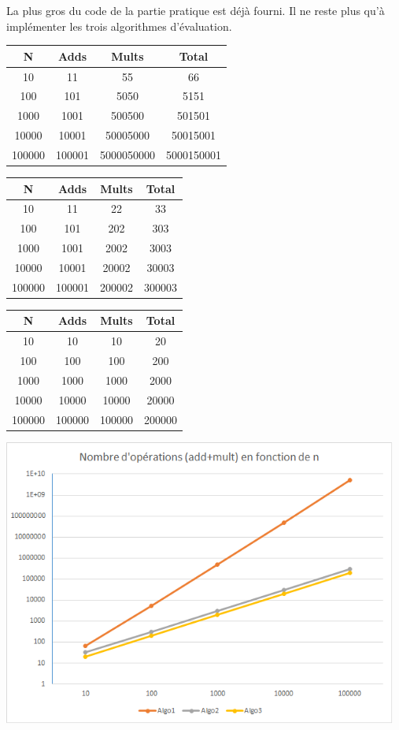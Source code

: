 \documentclass[11pt,a4paper]{article}
\begin{document}
La plus gros du code de la partie pratique est déjà fourni. Il ne reste plus qu'à implémenter les trois algorithmes d'évaluation.

\begin{center}
\begin{tabular}{ | c | c | c | c | }
	\hline  
	N & Adds & Mults & Total \\
	\hline                       
	10 & 11 & 55 & 66 \\
	100 & 101 & 5050 & 5151 \\
	1000 & 1001 & 500500 & 501501 \\
	10000 & 10001 & 50005000 & 50015001 \\
	100000 & 100001 & 5000050000 & 5000150001 \\
	\hline  
\end{tabular}
\end{center}
\begin{center}
\begin{tabular}{ | c | c | c | c | }
	\hline  
	N & Adds & Mults & Total \\
	\hline                       
	10 & 11 & 22 & 33 \\
	100 & 101 & 202 & 303 \\
	1000 & 1001 & 2002 & 3003 \\
	10000 & 10001 & 20002 & 30003 \\
	100000 & 100001 & 200002 & 300003 \\
	\hline  
\end{tabular}
\end{center}
\begin{center}
\begin{tabular}{ | c | c | c | c | }
	\hline  
	N & Adds & Mults & Total \\
	\hline                       
	10 & 10 & 10 & 20 \\
	100 & 100 & 100 & 200 \\
	1000 & 1000 & 1000 & 2000 \\
	10000 & 10000 & 10000 & 20000 \\
	100000 & 100000 & 100000 & 200000 \\
	\hline  
\end{tabular}
\end{center}
\vspace{1em}

\begin{center}
\includegraphics[width=13cm]{img_graph}
\end{center}
\end{document}
